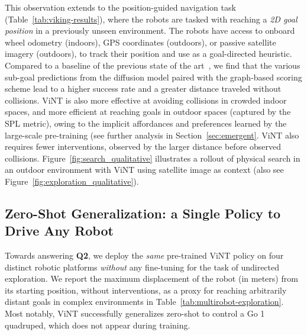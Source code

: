 \documentclass{article}
\newcommand{\ModelName}{ViNT\xspace}
\begin{document}
This observation extends to the position-guided navigation task (Table~\ref{tab:viking-results}), where the robots are tasked with reaching a \emph{2D goal position} in a previously unseen environment. The robots have access to onboard wheel odometry (indoors), GPS coordinates (outdoors), or passive satellite imagery (outdoors), to track their position and use as a goal-directed heuristic. Compared to a baseline of the previous state of the art~\cite{shah2022viking}, we find that the various sub-goal predictions from the diffusion model paired with the graph-based scoring scheme lead to a higher success rate and a greater distance traveled without collisions. \ModelName is also more effective at avoiding collisions in crowded indoor spaces, and more efficient at reaching goals in outdoor spaces (captured by the SPL metric), owing to the implicit affordances and preferences learned by the large-scale pre-training (see further analysis in Section~\ref{sec:emergent}. \ModelName also requires fewer interventions, observed by the larger distance before observed collisions. Figure~\ref{fig:search_qualitative} illustrates a rollout of physical search in an outdoor environment with \ModelName using satellite image as context (also see Figure~\ref{fig:exploration_qualitative}).



\subsection{Zero-Shot Generalization: a Single Policy to Drive Any Robot}
\label{sec:multirobot-results}



Towards answering \textbf{Q2}, we deploy the \emph{same} pre-trained \ModelName policy on four distinct robotic platforms \emph{without} any fine-tuning for the task of undirected exploration. We report the maximum displacement of the robot (in meters) from its starting position, without interventions, as a proxy for reaching arbitrarily distant goals in complex environments in Table~\ref{tab:multirobot-exploration}. Most notably, \ModelName successfully generalizes zero-shot to control a Go 1 quadruped, which does not appear during training.
\end{document}
